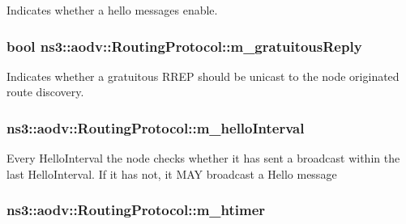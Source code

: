 Indicates whether a hello messages enable. 

\subsubsection[{\texorpdfstring{m\+\_\+gratuitous\+Reply}{m_gratuitousReply}}]{\setlength{\rightskip}{0pt plus 5cm}bool ns3\+::aodv\+::\+Routing\+Protocol\+::m\+\_\+gratuitous\+Reply\hspace{0.3cm}{\ttfamily [private]}}\hypertarget{classns3_1_1aodv_1_1RoutingProtocol_a492b1b69b8f91b56ba3301006318a4f3}{}\label{classns3_1_1aodv_1_1RoutingProtocol_a492b1b69b8f91b56ba3301006318a4f3}


Indicates whether a gratuitous R\+R\+EP should be unicast to the node originated route discovery. 

\subsubsection[{\texorpdfstring{m\+\_\+hello\+Interval}{m_helloInterval}}]{ ns3\+::aodv\+::\+Routing\+Protocol\+::m\+\_\+hello\+Interval\hspace{0.3cm}{\ttfamily [private]}}\hypertarget{classns3_1_1aodv_1_1RoutingProtocol_aa9750612eb154b537b1d7d0350cb8912}{}\label{classns3_1_1aodv_1_1RoutingProtocol_aa9750612eb154b537b1d7d0350cb8912}
Every Hello\+Interval the node checks whether it has sent a broadcast within the last Hello\+Interval. If it has not, it M\+AY broadcast a Hello message 
\subsubsection[{\texorpdfstring{m\+\_\+htimer}{m_htimer}}]{ ns3\+::aodv\+::\+Routing\+Protocol\+::m\+\_\+htimer\hspace{0.3cm}{\ttfamily [private]}}\hypertarget{classns3_1_1aodv_1_1RoutingProtocol_af02203aca026cce1814848e0b025d212}{}\label{classns3_1_1aodv_1_1RoutingProtocol_af02203aca026cce1814848e0b025d212}


